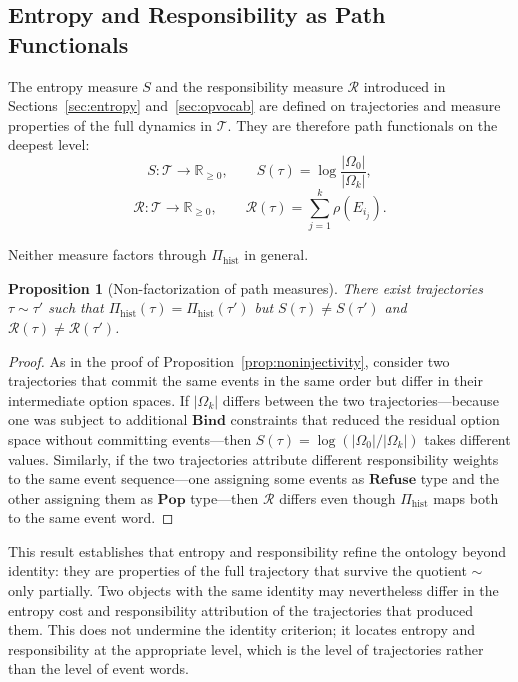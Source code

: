 \documentclass[12pt]{article}
\theoremstyle{plain}
\newtheorem{proposition}[theorem]{Proposition}
\theoremstyle{definition}
\theoremstyle{remark}
\newcommand{\Bind}{\mathbf{Bind}}
\begin{document}
\subsection{Entropy and Responsibility as Path Functionals}

The entropy measure $S$ and the responsibility measure $\mathcal{R}$ introduced
in Sections~\ref{sec:entropy} and~\ref{sec:opvocab} are defined on trajectories
and measure properties of the full dynamics in $\mathcal{T}$.  They are
therefore path functionals on the deepest level:
\[
  S : \mathcal{T} \to \mathbb{R}_{\geq 0}, \qquad
  S(\tau) = \log \frac{|\Omega_0|}{|\Omega_k|},
\]
\[
  \mathcal{R} : \mathcal{T} \to \mathbb{R}_{\geq 0}, \qquad
  \mathcal{R}(\tau) = \sum_{j=1}^{k} \rho(E_{i_j}).
\]

Neither measure factors through $\Pi_{\mathrm{hist}}$ in general.

\begin{proposition}[Non-factorization of path measures]
\label{prop:nonfactorization}
There exist trajectories $\tau \sim \tau'$ such that
$\Pi_{\mathrm{hist}}(\tau) = \Pi_{\mathrm{hist}}(\tau')$ but
$S(\tau) \neq S(\tau')$ and $\mathcal{R}(\tau) \neq \mathcal{R}(\tau')$.
\end{proposition}

\begin{proof}
As in the proof of Proposition~\ref{prop:noninjectivity}, consider two
trajectories that commit the same events in the same order but differ in their
intermediate option spaces.  If $|\Omega_k|$ differs between the two
trajectories---because one was subject to additional $\Bind$ constraints that
reduced the residual option space without committing events---then $S(\tau) =
\log(|\Omega_0|/|\Omega_k|)$ takes different values.  Similarly, if the two
trajectories attribute different responsibility weights to the same event
sequence---one assigning some events as $\mathbf{Refuse}$ type and the other
assigning them as $\mathbf{Pop}$ type---then $\mathcal{R}$ differs even though
$\Pi_{\mathrm{hist}}$ maps both to the same event word.
\end{proof}

This result establishes that entropy and responsibility refine the ontology
beyond identity: they are properties of the full trajectory that survive the
quotient $\sim$ only partially.  Two objects with the same identity may
nevertheless differ in the entropy cost and responsibility attribution of the
trajectories that produced them.  This does not undermine the identity criterion;
it locates entropy and responsibility at the appropriate level, which is the
level of trajectories rather than the level of event words.
\end{document}
